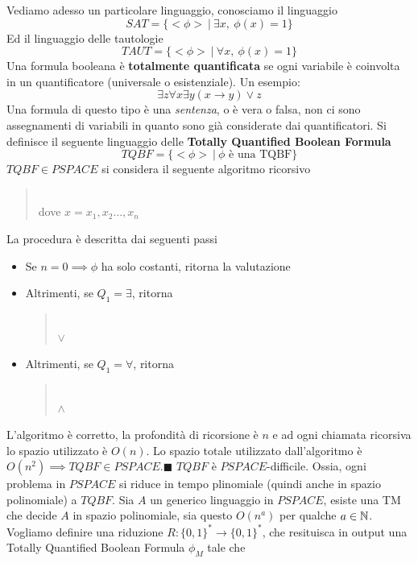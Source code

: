\documentclass[10pt, letterpaper]{report}
\begin{document}
Vediamo adesso un particolare linguaggio, conosciamo il linguaggio $$ SAT=\{<\phi>\ | \ \exists x,\ \phi(x)=1 \}$$
Ed il linguaggio delle tautologie 
$$ TAUT=\{<\phi> \ | \ \forall x, \ \phi(x)=1\}$$
 Una formula booleana è \textbf{totalmente quantificata} se ogni variabile è coinvolta in un quantificatore (universale o esistenziale). Un esempio:$$\exists z \forall x \exists y (x\rightarrow y) \lor z $$
Una formula di questo tipo è una \textit{sentenza}, o è vera o falsa, non ci sono assegnamenti di variabili in quanto sono già considerate dai quantificatori.
Si definisce il seguente linguaggio delle \textbf{Totally Quantified Boolean Formula}
$$ TQBF=\{<\phi> \ | \ \phi \text{ è una TQBF} \}$$
\teo{} $TQBF\in PSPACE$\acc 
\dimo{} si considera il seguente algoritmo ricorsivo \begin{quote}
     \\ 
    dove $x=x_1,x_2\dots ,x_n$
\end{quote}
La procedura è descritta dai seguenti passi \begin{itemize}
    \item Se $n=0\implies \phi$ ha solo costanti, ritorna la valutazione 
    \item Altrimenti, se $Q_1=\exists$, ritorna \begin{quote}
\\ $\lor$\\
    \end{quote}
    \item Altrimenti, se $Q_1=\forall$, ritorna \begin{quote}
\\ $\land$\\
    \end{quote}
\end{itemize}
L'algoritmo è corretto, la profondità di ricorsione è $n$ e ad ogni chiamata ricorsiva lo spazio utilizzato è $O(n)$. Lo spazio totale utilizzato dall'algoritmo è $O(n^2)\implies TQBF\in PSPACE$.\hfill$\blacksquare$\acc 
\teo{} $TQBF$ è $PSPACE$-difficile. Ossia, ogni problema in $PSPACE$ si riduce in tempo plinomiale (quindi anche in spazio polinomiale) a $TQBF$.\acc 
\dimo{} Sia $A$ un generico linguaggio in $PSPACE$, esiste una TM che decide $A$ in spazio polinomiale, sia questo $O(n^a)$ per qualche $a\in {\mathbb N}$. Vogliamo definire una riduzione $R : \{0,1\}^*\rightarrow \{0,1\}^*$, che resituisca in output una Totally Quantified Boolean Formula $\phi_M$ tale che 
\end{document}

